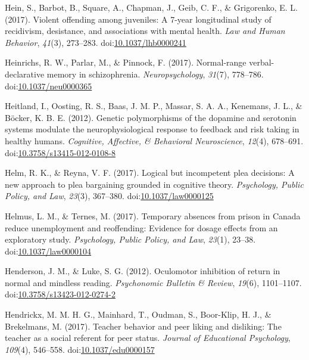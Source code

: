 \documentclass[english,man]{apa6}
\theoremstyle{definition}
\theoremstyle{definition}
\theoremstyle{definition}
\theoremstyle{remark}
\begin{document}
\hypertarget{ref-Hein2017}{}
Hein, S., Barbot, B., Square, A., Chapman, J., Geib, C. F., \&
Grigorenko, E. L. (2017). Violent offending among juveniles: A 7-year
longitudinal study of recidivism, desistance, and associations with
mental health. \emph{Law and Human Behavior}, \emph{41}(3), 273--283.
doi:\href{https://doi.org/10.1037/lhb0000241}{10.1037/lhb0000241}

\hypertarget{ref-Heinrichs2017}{}
Heinrichs, R. W., Parlar, M., \& Pinnock, F. (2017). Normal-range
verbal-declarative memory in schizophrenia. \emph{Neuropsychology},
\emph{31}(7), 778--786.
doi:\href{https://doi.org/10.1037/neu0000365}{10.1037/neu0000365}

\hypertarget{ref-Heitland2012}{}
Heitland, I., Oosting, R. S., Baas, J. M. P., Massar, S. A. A.,
Kenemans, J. L., \& Böcker, K. B. E. (2012). Genetic polymorphisms of
the dopamine and serotonin systems modulate the neurophysiological
response to feedback and risk taking in healthy humans. \emph{Cognitive,
Affective, \& Behavioral Neuroscience}, \emph{12}(4), 678--691.
doi:\href{https://doi.org/10.3758/s13415-012-0108-8}{10.3758/s13415-012-0108-8}

\hypertarget{ref-Helm2017}{}
Helm, R. K., \& Reyna, V. F. (2017). Logical but incompetent plea
decisions: A new approach to plea bargaining grounded in cognitive
theory. \emph{Psychology, Public Policy, and Law}, \emph{23}(3),
367--380.
doi:\href{https://doi.org/10.1037/law0000125}{10.1037/law0000125}

\hypertarget{ref-Helmus2017}{}
Helmus, L. M., \& Ternes, M. (2017). Temporary absences from prison in
Canada reduce unemployment and reoffending: Evidence for dosage effects
from an exploratory study. \emph{Psychology, Public Policy, and Law},
\emph{23}(1), 23--38.
doi:\href{https://doi.org/10.1037/law0000104}{10.1037/law0000104}

\hypertarget{ref-Henderson2012}{}
Henderson, J. M., \& Luke, S. G. (2012). Oculomotor inhibition of return
in normal and mindless reading. \emph{Psychonomic Bulletin \& Review},
\emph{19}(6), 1101--1107.
doi:\href{https://doi.org/10.3758/s13423-012-0274-2}{10.3758/s13423-012-0274-2}

\hypertarget{ref-Hendrickx2017}{}
Hendrickx, M. M. H. G., Mainhard, T., Oudman, S., Boor-Klip, H. J., \&
Brekelmans, M. (2017). Teacher behavior and peer liking and disliking:
The teacher as a social referent for peer status. \emph{Journal of
Educational Psychology}, \emph{109}(4), 546--558.
doi:\href{https://doi.org/10.1037/edu0000157}{10.1037/edu0000157}
\end{document}
